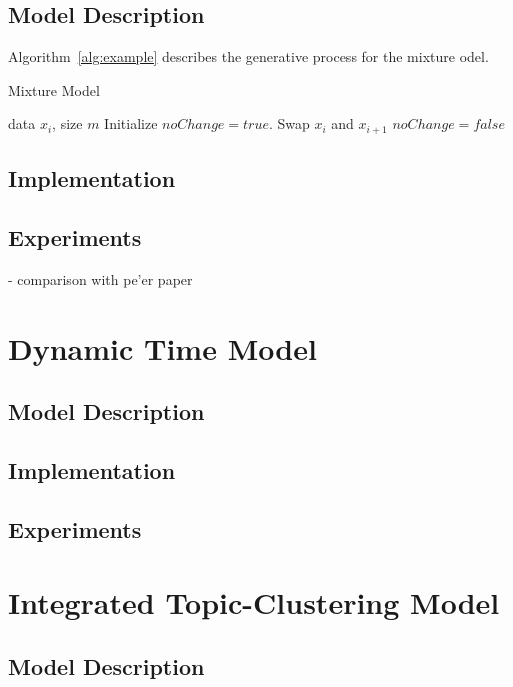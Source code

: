 \documentclass{article}
\begin{document}
\subsection{Model Description} 
    Algorithm~\ref{alg:example} describes the generative process for the mixture odel.

    \begin{algorithm}[tb]
       \caption{Mixture Model}
       \label{alg:example}
    \begin{algorithmic}
        data $x_i$, size $m$
       \REPEAT
       \STATE Initialize $noChange = true$.
       \STATE Swap $x_i$ and $x_{i+1}$
       \STATE $noChange = false$
       \ENDIF
       \ENDFOR
    \end{algorithmic}
    \end{algorithm}
\subsection{Implementation} 
\subsection{Experiments}  
- comparison with pe'er paper


\section{Dynamic Time Model} 
\label{dtmsec}
\subsection{Model Description} 
\subsection{Implementation} 
\subsection{Experiments} 


\section{Integrated Topic-Clustering Model} 
\label{intsec}
\subsection{Model Description} 
\end{document}
